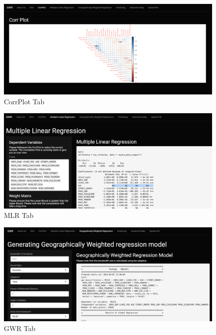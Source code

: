 \documentclass[manuscript,screen]{acmart}
\begin{document}
\begin{figure}

{\centering \includegraphics{images/Screenshot 2023-04-14 at 11.41.50 PM.png}

}

\caption{\label{fig-3}CorrPlot Tab}

\end{figure}

\begin{figure}

{\centering \includegraphics{images/Screenshot 2023-04-14 at 11.42.39 PM.png}

}

\caption{\label{fig-4}MLR Tab}

\end{figure}

\begin{figure}

{\centering \includegraphics{images/Screenshot 2023-04-14 at 11.57.14 PM.png}

}

\caption{\label{fig-5}GWR Tab}

\end{figure}
\end{document}
